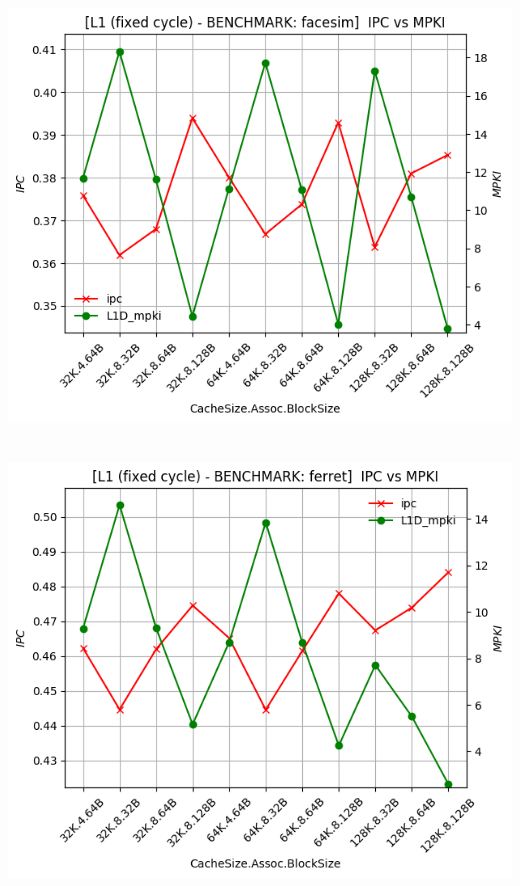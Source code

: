 \begin{minipage}{\textwidth}
    \begin{center}
        \\
        \vspace{3mm}
        \includegraphics[scale=0.70]{graphs/L1/fixed/facesim.png}
        \vspace{6mm}
    \end{center}
\end{minipage}

\begin{minipage}{\textwidth}
    \begin{center}
        \\
        \vspace{3mm}
        \includegraphics[scale=0.70]{graphs/L1/fixed/ferret.png}
        \vspace{6mm}
    \end{center}
\end{minipage}


